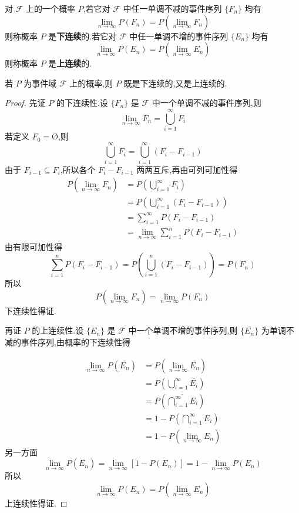 \begin{definition}
    \indent 对 $\mathcal{F}$ 上的一个概率 $P$,若它对 $\mathcal{F}$ 中任一单调不减的事件序列 $\{F_n\}$ 均有
    $$
    \lim_{n \to \infty} P(F_n) = P(\lim_{n \to \infty} F_n)
    $$
    则称概率 $P$ 是\textbf{下连续}的.若它对 $\mathcal{F}$ 中任一单调不增的事件序列 $\{E_n\}$ 均有
    $$
    \lim_{n \to \infty} P(E_n) = P(\lim_{n \to \infty} E_n)
    $$
    则称概率 $P$ 是\textbf{上连续}的.
\end{definition}

\begin{property}
    \indent 若 $P$ 为事件域 $\mathcal{F}$ 上的概率,则 $P$ 既是下连续的,又是上连续的.
\end{property}

\begin{proof}
    先证 $P$ 的下连续性.设 $\{ F_n \}$ 是 $\mathcal{F}$ 中一个单调不减的事件序列,则
    $$
    \lim_{n \to \infty} F_n = \bigcup_{i=1}^{\infty} F_i
    $$
    若定义 $F_0 = \text{\O}$,则
    $$
    \bigcup_{i=1}^{\infty} F_i = \bigcup_{i=1}^{\infty} (F_i - F_{i-1})
    $$
    由于 $F_{i-1} \subseteq F_i$,所以各个 $F_i - F_{i-1}$ 两两互斥,再由可列可加性得
    $$
    \begin{aligned}
        P(\lim_{n \to \infty} F_n) &= P \left( \bigcup_{i=1}^{\infty} F_i \right) \\
        &= P \left( \bigcup_{i=1}^{\infty} (F_i - F_{i-1}) \right) \\
        &= \sum_{i=1}^{\infty} P(F_i - F_{i-1}) \\
        &= \lim_{n \to \infty} \sum_{i=1}^n P(F_i - F_{i-1})
    \end{aligned}
    $$
    由有限可加性得
    $$
    \sum_{i=1}^n P(F_i - F_{i-1}) = P \left( \bigcup_{i=1}^n (F_i - F_{i-1}) \right) = P(F_n)
    $$
    所以
    $$
    P(\lim_{n \to \infty} F_n) = \lim_{n \to \infty} P(F_n)
    $$
    下连续性得证.

    再证 $P$ 的上连续性.设 $\{ E_n \}$ 是 $\mathcal{F}$ 中一个单调不增的事件序列,则 $\{ \overline{E_n} \}$ 为单调不减的事件序列,由概率的下连续性得

    $$
    \begin{aligned}
        \lim_{n \to \infty} P(\overline{E_n}) &= P(\lim_{n \to \infty} \overline{E_n}) \\
        &= P \left( \bigcup_{i=1}^{\infty} \overline{E_i} \right) \\
        &= P \left(\overline{\bigcap_{i=1}^{\infty} E_i} \right) \\
        &= 1 - P \left(\bigcap_{i=1}^{\infty} E_i \right) \\
        &= 1 - P(\lim_{n \to \infty} E_n)
    \end{aligned}
    $$
    另一方面
    $$
    \lim_{n \to \infty} P(\overline{E_n}) = \lim_{n \to \infty} [1 - P(E_n)] = 1 - \lim_{n \to \infty} P(E_n)
    $$
    所以
    $$
    \lim_{n \to \infty} P(E_n) = P(\lim_{n \to \infty} E_n)
    $$
    上连续性得证.
\end{proof}


